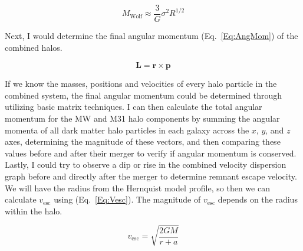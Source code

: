 \documentclass[linenumbers,trackchanges]{aastex7}
\begin{document}
\begin{equation}
    \label{Eq:Wolf}
    M_\mathrm{Wolf}\approx\frac{3}{G}\sigma^2 R^{1/2}
\end{equation}

Next, I would determine the final angular momentum (Eq.~\ref{Eq:AngMom}) of the combined halos. 

\begin{equation}
    \label{Eq:AngMom}
    \mathbf{L} = \mathbf{r}\times\mathbf{p}
\end{equation}

If we know the masses, positions and velocities of every halo particle in the combined system, the final angular momentum could be determined through utilizing basic matrix techniques. I can then calculate the total angular momentum for the MW and M31 halo components by summing the angular momenta of all dark matter halo particles in each galaxy across the $x$, $y$, and $z$ axes, determining the magnitude of these vectors, and then comparing these values before and after their merger to verify if angular momentum is conserved. Lastly, I could try to observe a dip or rise in the combined velocity dispersion graph before and directly after the merger to determine remnant escape velocity. We will have the radius from the Hernquist model profile, so then we can calculate $v_\mathrm{esc}$ using (Eq.~\ref{Eq:Vesc}). The magnitude of $v_\mathrm{esc}$ depends on the radius within the halo.

\begin{equation}
    \label{Eq:Vesc}
    v_\mathrm{esc} = \sqrt{\frac{2GM}{r+a}}
\end{equation}
\end{document}
